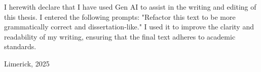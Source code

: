 

\begin{useofgenai}       

I herewith declare that I have used Gen AI to assist in the writing and editing of this thesis.
I entered the following prompts: "Refactor this text to be more grammatically correct and dissertation-like."
I used it to improve the clarity and readability of my writing, ensuring that the final text adheres to academic standards.

\vspace{10mm}

Limerick, 2025

\end{useofgenai}


